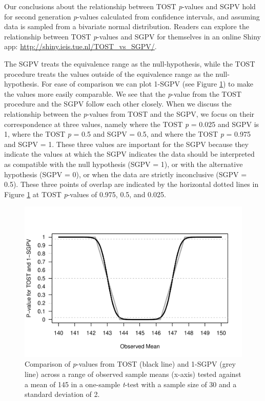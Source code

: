 \documentclass[,man,floatsintext]{apa6}
\begin{document}
Our conclusions about the relationship between TOST \emph{p}-values and SGPV hold for second generation \emph{p}-values calculated from confidence intervals, and assuming data is sampled from a bivariate normal distribution. Readers can explore the relationship between TOST \emph{p}-values and SGPV for themselves in an online Shiny app: \url{http://shiny.ieis.tue.nl/TOST_vs_SGPV/}.

The SGPV treats the equivalence range as the null-hypothesis, while the TOST procedure treats the values outside of the equivalence range as the null-hypothesis. For ease of comparison we can plot 1-SGPV (see Figure \ref{fig:TOSTSGPV2}) to make the values more easily comparable. We see that the \emph{p}-value from the TOST procedure and the SGPV follow each other closely. When we discuss the relationship between the \emph{p}-values from TOST and the SGPV, we focus on their correspondence at three values, namely where the TOST \emph{p} = 0.025 and SGPV is 1, where the TOST \emph{p} = 0.5 and SGPV = 0.5, and where the TOST \emph{p} = 0.975 and SGPV = 1. These three values are important for the SGPV because they indicate the values at which the SGPV indicates the data should be interpreted as compatible with the null hypothesis (SGPV = 1), or with the alternative hypothesis (SGPV = 0), or when the data are strictly inconclusive (SGPV = 0.5). These three points of overlap are indicated by the horizontal dotted lines in Figure \ref{fig:TOSTSGPV2} at TOST \emph{p}-values of 0.975, 0.5, and 0.025.

\begin{figure}
\centering
\includegraphics{manuscript.R2_files/figure-latex/TOSTSGPV2-1.pdf}
\caption{\label{fig:TOSTSGPV2}Comparison of \emph{p}-values from TOST (black line) and 1-SGPV (grey line) across a range of observed sample means (x-axis) tested against a mean of 145 in a one-sample \emph{t}-test with a sample size of 30 and a standard deviation of 2.}
\end{figure}
\end{document}
